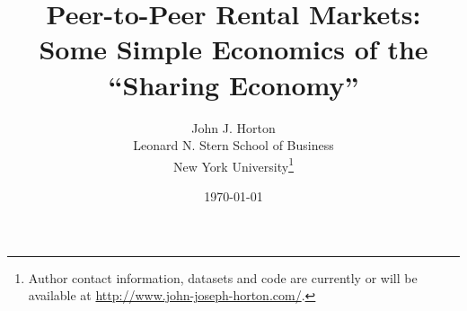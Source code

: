 \documentclass[11pt]{article}
\begin{document}
 

\newtheorem{prop}{Proposition}

\title{Peer-to-Peer Rental Markets: \\ Some Simple Economics of the ``Sharing Economy''} 

\date{\today}

\author{John J. Horton \\ Leonard N. Stern School of Business \\ New York University\footnote{ Author contact information, datasets and code are currently or will be available at \href{http://www.john-joseph-horton.com/}{http://www.john-joseph-horton.com/}. } }
\maketitle

\end{document}
